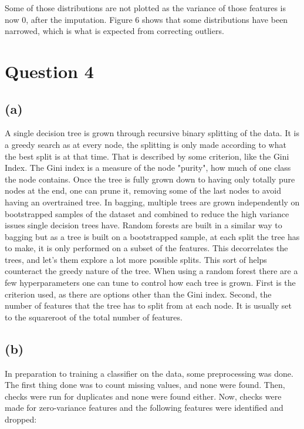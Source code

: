 \documentclass[12pt]{report} %
\begin{document}
Some of those distributions are not plotted as the variance of those features is now 0, after the imputation. Figure 6 shows that some distributions have been narrowed, which is what is expected from correcting outliers.

\section*{Question 4}

\subsection*{(a)}

A single decision tree is grown through recursive binary splitting of the data. It is a greedy search as at every node, the splitting is only made according to what the best split is at that time\cite[pp. 337-338]{james2013introduction}. That is described by some criterion, like the Gini Index. The Gini index is a measure of the node "purity", how much of one class the node contains\cite[pp. 338-339]{james2013introduction}. Once the tree is fully grown down to having only totally pure nodes at the end, one can prune it, removing some of the last nodes to avoid having an overtrained tree. In bagging, multiple trees are grown independently on bootstrapped samples of the dataset and combined to reduce the high variance issues single decision trees have\cite[p. 343]{james2013introduction}. Random forests are built in a similar way to bagging but as a tree is built on a bootstrapped sample, at each split the tree has to make, it is only performed on a subset of the features. This decorrelates the trees, and let's them explore a lot more possible splits\cite[354]{james2013introduction}. This sort of helps counteract the greedy nature of the tree. When using a random forest there are a few hyperparameters one can tune to control how each tree is grown. First is the criterion used, as there are options other than the Gini index. Second, the number of features that the tree has to split from at each node. It is usually set to the squareroot of the total number of features.

\subsection*{(b)}

In preparation to training a classifier on the data, some preprocessing was done. The first thing done was to count missing values, and none were found. Then, checks were run for duplicates and none were found either. Now, checks were made for zero-variance features and the following features were identified and dropped:
\end{document}

